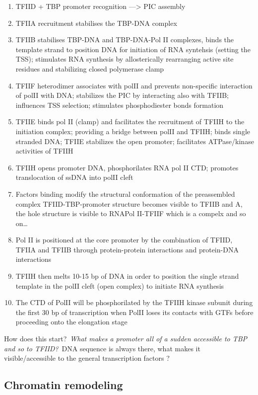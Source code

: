 \begin{enumerate}
\def\labelenumi{\arabic{enumi}.}
\tightlist
\item
  TFIID + TBP promoter recognition ---\textgreater{} PIC assembly
\item
  TFIIA recruitment stabilises the TBP-DNA complex
\item
  TFIIB stabilises TBP-DNA and TBP-DNA-Pol II complexes, binds the template strand to position DNA for initiation of RNA syntehsis (setting the TSS); stimulates RNA synthesis by allosterically rearranging active site residues and stabilizing closed polymerase clamp
\item
  TFIIF heterodimer associates with polII and prevents non-specific interaction of polII with DNA; stabilizes the PIC by interacting also with TFIIB; influences TSS selection; stimulates phosphodiester bonds formation
\item
  TFIIE binds pol II (clamp) and facilitates the recruitment of TFIIH to the initiation complex; providing a bridge between polII and TFIIH; binds single stranded DNA; TFIIE stabilizes the open promoter; facilitates ATPase/kinase activities of TFIIH
\item
  TFIIH opens promoter DNA, phosphorilates RNA pol II CTD; promotes translocation of ssDNA into polII cleft
\item
  Factors binding modify the structural conformation of the preassembled complex TFIID-TBP-promoter structure becomes visible to TFIIB and A, the hole structure is visible to RNAPol II-TFIIF which is a compelx and so on\ldots{}
\item
  Pol II is positioned at the core promoter by the combination of TFIID, TFIIA and TFIIB through protein-protein interactions and protein-DNA interactions
\item
  TFIIH then melts 10-15 bp of DNA in order to position the single strand template in the polII cleft (open complex) to initiate RNA synthesis
\item
  The CTD of PolII will be phosphorilated by the TFIIH kinase subunit during the first 30 bp of transcription when PolII loses its contacts with GTFs before proceeding onto the elongation stage
\end{enumerate}

How does this start?~\emph{What makes a promoter all of a sudden accessible to TBP and so to TFIID?}~DNA sequence is always there, what makes it visible/accessible to the general transcription factors ?

\hypertarget{chromatin-remodeling}{%
\subsection{Chromatin remodeling}\label{chromatin-remodeling}}

